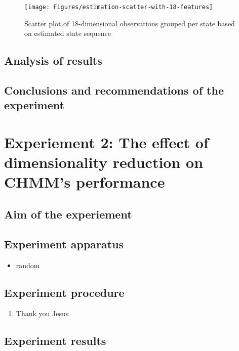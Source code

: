 \begin{figure}[ht!]
	\texttt{[image: Figures/estimation-scatter-with-18-features]}
	\caption{Scatter plot of 18-dimensional observations grouped per state based on estimated state sequence}
	\label{fig:es-18dim}
\end{figure}

\subsection{Analysis of results}

\subsection{Conclusions and recommendations of the experiment}

\section{Experiement 2: The effect of dimensionality reduction on CHMM's performance}

\subsection{Aim of the experiement}

\subsection{Experiment apparatus}
\begin{itemize}
	\item random
\end{itemize}

\subsection{Experiment procedure}
\begin{enumerate}
	\item Thank you Jesus
\end{enumerate}

\subsection{Experiment results}
\begin{figure}[ht!]
\end{figure}

